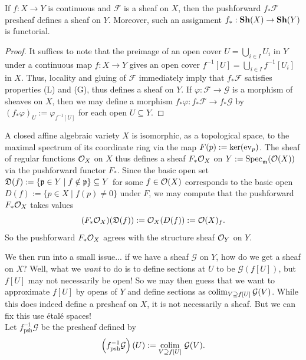 \begin{prop}
	If $f:X \to Y$ is continuous and $\mathcal{F}$ is a sheaf on $X$, then the pushforward $f_*\mathcal{F}$ presheaf defines a sheaf on $Y$. Moreover, such an assignment $f_* : \mathbf{Sh}(X) \to \mathbf{Sh}(Y)$ is functorial.
\end{prop}
\begin{proof}
	It suffices to note that the preimage of an open cover $U = \bigcup_{i \in I} U_i$ in $Y$ under a continuous map $f: X \to Y$ gives an open cover $f^{-1}[U] = \bigcup_{i \in I} f^{-1}[U_i]$ in $X$. Thus, locality and gluing of $\mathcal{F}$ immediately imply that $f_*\mathcal{F}$ satisfies properties (L) and (G), thus defines a sheaf on $Y$. If $\varphi : \mathcal{F} \to \mathcal{G}$ is a morphism of sheaves on $X$, then we may define a morphism $f_*\varphi : f_*\mathcal{F} \to f_*\mathcal{G}$ by $(f_*\varphi)_U := \varphi_{f^{-1}[U]}$ for each open $U \subseteq Y$.
\end{proof}

\begin{eg}
	A closed affine algebraic variety $X$ is isomorphic, as a topological space, to the maximal spectrum of its coordinate ring via the map $F(p) := \ker(\mathrm{ev}_p)$. The sheaf of regular functions $\mathcal{O}_X$ on $X$ thus defines a sheaf $F_*\mathcal{O}_X$ on $Y := \mathrm{Spec}_{\mathfrak{m}} (\mathcal{O}(X))$ via the pushforward functor $F_*$. Since the basic open set $\mathfrak{D}(f) := \{\mathfrak{p} \in Y \mid f \notin \mathfrak{p}\} \subseteq Y$ for some $f \in \mathcal{O}(X)$ corresponds to the basic open $D(f) := \{p \in X \mid f(p) \neq 0\}$ under $F$, we may compute that the pushforward $F_*\mathcal{O}_X$ takes values 
	\[
		(F_*\mathcal{O}_X)(\mathfrak{D}(f)) := \mathcal{O}_X(D(f)) := \mathcal{O}(X)_f.
	\]
	So the pushforward $F_*\mathcal{O}_X$ agrees with the structure sheaf $\mathcal{O}_{Y}$ on $Y$.
\end{eg}

We then run into a small issue... if we have a sheaf $\mathcal{G}$ on $Y$, how do we get a sheaf on $X$? Well, what we \emph{want} to do is to define sections at $U$ to be $\mathcal{G}(f[U])$, but $f[U]$ may not necessarily be open! So we may then guess that we want to approximate $f[U]$ by opens of $Y$ and define sections as $\mathop{\mathrm{colim}}_{V \supseteq f[U]} \mathcal{G}(V)$. While this does indeed define a presheaf on $X$, it is not necessarily a sheaf. But we can fix this use \'etal\'e spaces!\\

Let $f^{-1}_\text{psh}\mathcal{G}$ be the presheaf defined by 
\[
	\left(f^{-1}_\text{psh}\mathcal{G}\right)(U) := \mathop{\mathrm{colim}}\limits_{V \supseteq f[U]}\, \mathcal{G}(V).
\]


